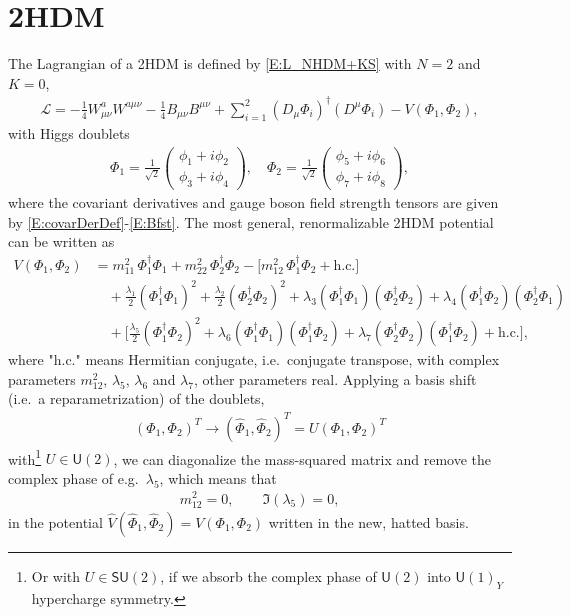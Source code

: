 \documentclass[a4paper,hidelinks, 12pt]{article}
\numberwithin{equation}{section}
\theoremstyle{plain}
\newcommand{\Lg}{\mathsf}
\newcommand{\mc}{\mathcal}
\begin{document}
\section{2HDM}
\label{sec:2HDM}
The Lagrangian of a 2HDM
is defined by \eqref{E:L_NHDM+KS} with $N=2$ and $K=0$,
\begin{align}\label{E:2HDMlag}
	\mc{L}
= -\tfrac{1}{4}W^a_{\mu\nu}W^{a\mu\nu}
  -\tfrac{1}{4}B_{\mu\nu}B^{\mu\nu}
  + \sum_{i=1}^2 (D_\mu\Phi_i)^\dagger (D^\mu\Phi_i)
  - V(\Phi_1,\Phi_2),
\end{align}
with 
Higgs doublets
\begin{align}\label{E:HiggsDoublets2HDM}
\Phi_1 = \frac{1}{\sqrt{2}}
\begin{pmatrix}
\phi_{1} + i \phi_{2} \\
\phi_{3} + i \phi_{4}
\end{pmatrix}, \quad
 \Phi_2 = \frac{1}{\sqrt{2}}
\begin{pmatrix}
\phi_{5} + i \phi_{6} \\
\phi_{7} + i \phi_{8}
\end{pmatrix},
\end{align}
where the
covariant derivatives and gauge boson field strength tensors are given by \eqref{E:covarDerDef}-\eqref{E:Bfst}.
The most general, renormalizable 2HDM potential can be written as
\begin{align}
V(\Phi_1,\Phi_2) &= m_{11}^2\,\Phi_1^\dagger\Phi_1 + m_{22}^2\,\Phi_2^\dagger\Phi_2
   -\big[ m_{12}^2\,\Phi_1^\dagger\Phi_2 + \text{h.c.}\big] \nonumber\\
 &\quad + \tfrac{\lambda_1}{2}(\Phi_1^\dagger\Phi_1)^2
   + \tfrac{\lambda_2}{2}(\Phi_2^\dagger\Phi_2)^2
   + \lambda_3(\Phi_1^\dagger\Phi_1)(\Phi_2^\dagger\Phi_2)
   + \lambda_4(\Phi_1^\dagger\Phi_2)(\Phi_2^\dagger\Phi_1) \nonumber\\
 &\quad + \Big[ \tfrac{\lambda_5}{2}(\Phi_1^\dagger\Phi_2)^2
   + \lambda_6(\Phi_1^\dagger\Phi_1)(\Phi_1^\dagger\Phi_2)
   + \lambda_7(\Phi_2^\dagger\Phi_2)(\Phi_1^\dagger\Phi_2)
   + \text{h.c.}\Big] ,
\end{align}
 where "h.c." means Hermitian conjugate, 
 i.e.~conjugate transpose, with complex parameters $m_{12}^2$, $\lambda_5$, $\lambda_6$ and $\lambda_7$, other parameters real. Applying a basis shift (i.e.~a reparametrization) of the doublets,
\begin{align}\label{E:basisTrafo2HDM}
	(\Phi_1,\Phi_2)^T\to(\hat{\Phi}_1,\hat{\Phi}_2)^T = U (\Phi_1,\Phi_2)^T
\end{align}
 with\footnote{Or with $U\in\Lg{SU}(2)$, if we absorb the complex phase of $\Lg{U}(2)$ into $\Lg{U}(1)_Y$ hypercharge symmetry.} $U\in \Lg{U}(2)$, we can diagonalize the mass-squared matrix
and remove the complex phase of e.g.~$\lambda_5$, which means that 
\begin{align}\label{E:parsDiagMM}
	m_{12}^2=0, \qquad \Im(\lambda_5)=0,
\end{align}
 in the potential $\hat{V}(\hat{\Phi}_1,\hat{\Phi}_2)=V({\Phi}_1,{\Phi}_2)$ written in the new, hatted basis.
\end{document}
